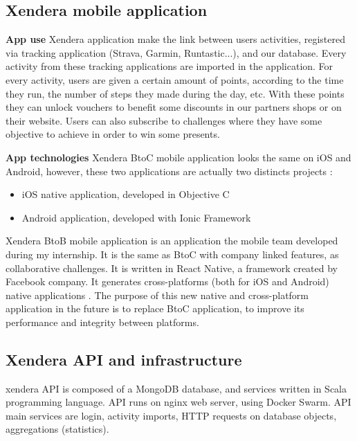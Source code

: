 \documentclass{article}
\begin{document}
            \subsection{Xendera mobile application}

                \textbf{App use} \newline
                Xendera application make the link between users activities,
                registered via tracking application (Strava, Garmin, Runtastic...), and our database.
                Every activity from these tracking applications are imported in the application. 
                For every activity, users are given a certain amount of
                points, according to the time they run, the number of steps they made during the day, etc.
                With these points they can unlock vouchers to benefit some discounts in our partners shops or on their
                website. Users can also subscribe to challenges where they have some objective to achieve in
                order to win some presents.

                \textbf{App technologies} \newline
                Xendera BtoC mobile application looks the same on iOS and Android, however, these two applications
                are actually two distincts projects :
                \begin{itemize}
                    \item{iOS native application, developed in Objective C}
                    \item{Android application, developed with Ionic Framework}
                \end{itemize}
                Xendera BtoB mobile application is an application the mobile team developed during my internship. 
                It is the same as BtoC with company linked features, as collaborative challenges. It is written
                in React Native, a framework created by Facebook company. It generates cross-platforms
                (both for iOS and Android) native applications . The purpose of this new native and cross-platform application in the future 
                is to replace BtoC application, to improve its performance and integrity between platforms.

            \subsection{Xendera API and infrastructure}
                xendera API is composed of a MongoDB database, and services written in Scala programming language.
                API runs on nginx web server, using Docker Swarm. API main services are login, activity imports,
                HTTP requests on database objects, aggregations (statistics).
            
\end{document}
